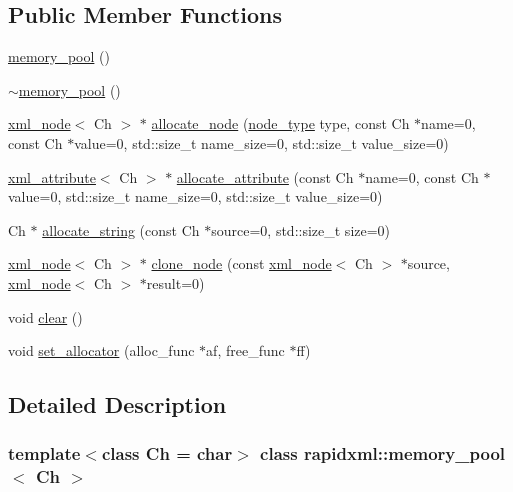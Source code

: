 \subsection*{Public Member Functions}
\begin{DoxyCompactItemize}
\item 
\hyperlink{classrapidxml_1_1memory__pool_a0b609da81dff28a19ebd704400788429}{memory\_\-pool} ()
\item 
\hyperlink{classrapidxml_1_1memory__pool_a0a3e82126e59e4077f41e933130bb5a0}{$\sim$memory\_\-pool} ()
\item 
\hyperlink{classrapidxml_1_1xml__node}{xml\_\-node}$<$ Ch $>$ $\ast$ \hyperlink{classrapidxml_1_1memory__pool_a4118581c29ee9a2f6b55ebf7dac185f8}{allocate\_\-node} (\hyperlink{namespacerapidxml_abb456db38f7efb746c4330eed6072a7c}{node\_\-type} type, const Ch $\ast$name=0, const Ch $\ast$value=0, std::size\_\-t name\_\-size=0, std::size\_\-t value\_\-size=0)
\item 
\hyperlink{classrapidxml_1_1xml__attribute}{xml\_\-attribute}$<$ Ch $>$ $\ast$ \hyperlink{classrapidxml_1_1memory__pool_a3de2a66c983336e006ea3844e244ed30}{allocate\_\-attribute} (const Ch $\ast$name=0, const Ch $\ast$value=0, std::size\_\-t name\_\-size=0, std::size\_\-t value\_\-size=0)
\item 
Ch $\ast$ \hyperlink{classrapidxml_1_1memory__pool_a171941b39d55b868358da97462185f58}{allocate\_\-string} (const Ch $\ast$source=0, std::size\_\-t size=0)
\item 
\hyperlink{classrapidxml_1_1xml__node}{xml\_\-node}$<$ Ch $>$ $\ast$ \hyperlink{classrapidxml_1_1memory__pool_a0a10679fc17597d339a0dc107f8a94ac}{clone\_\-node} (const \hyperlink{classrapidxml_1_1xml__node}{xml\_\-node}$<$ Ch $>$ $\ast$source, \hyperlink{classrapidxml_1_1xml__node}{xml\_\-node}$<$ Ch $>$ $\ast$result=0)
\item 
void \hyperlink{classrapidxml_1_1memory__pool_aad377c835fdaed1cb2cc9df194cf84e4}{clear} ()
\item 
void \hyperlink{classrapidxml_1_1memory__pool_a84d3d8d2cdfc00501e1dcf26d889ae03}{set\_\-allocator} (alloc\_\-func $\ast$af, free\_\-func $\ast$ff)
\end{DoxyCompactItemize}


\subsection{Detailed Description}
\subsubsection*{template$<$class Ch = char$>$ class rapidxml::memory\_\-pool$<$ Ch $>$}


